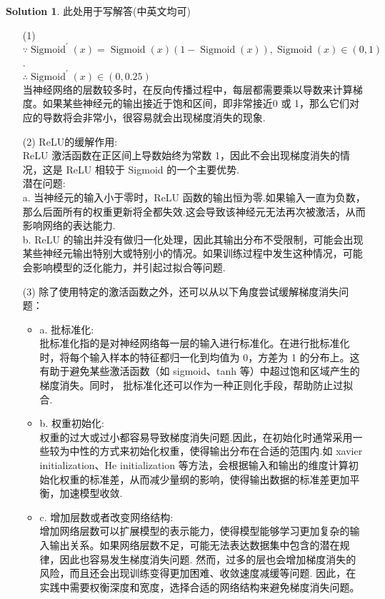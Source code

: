 \documentclass[a4paper,UTF8]{article}
\numberwithin{equation}{section}
\numberwithin{equation}{section}
\theoremstyle{definition}
\newtheorem*{solution}{Solution}
\begin{document}
\begin{solution}
    此处用于写解答(中英文均可)
	\begin{enumerate}
        \item [(1)]
        $\because\operatorname*{Sigmoid}^{\prime}(x) = \operatorname*{Sigmoid}(x)(1-\operatorname*{Sigmoid}(x)), \operatorname*{Sigmoid}(x) \in (0, 1)$.\\
        $\therefore \operatorname*{Sigmoid}^{\prime}(x) \in (0, 0.25)$ \\
        当神经网络的层数较多时，在反向传播过程中，每层都需要乘以导数来计算梯度。如果某些神经元的输出接近于饱和区间，即非常接近0 或 1，那么它们对应的导数将会非常小，很容易就会出现梯度消失的现象.
        \item [(2)]
        ReLU的缓解作用: \\
        ReLU 激活函数在正区间上导数始终为常数 1，因此不会出现梯度消失的情况，这是 ReLU 相较于 Sigmoid 的一个主要优势. \\
        潜在问题: \\
        a. 当神经元的输入小于零时，ReLU 函数的输出恒为零.如果输入一直为负数，那么后面所有的权重更新将全都失效.这会导致该神经元无法再次被激活，从而影响网络的表达能力. \\
        b. ReLU 的输出并没有做归一化处理，因此其输出分布不受限制，可能会出现某些神经元输出特别大或特别小的情况。如果训练过程中发生这种情况，可能会影响模型的泛化能力，并引起过拟合等问题.
        \item [(3)]
        除了使用特定的激活函数之外，还可以从以下角度尝试缓解梯度消失问题：
        \begin{itemize}
            \item a. 批标准化: \\批标准化指的是对神经网络每一层的输入进行标准化。在进行批标准化时，将每个输入样本的特征都归一化到均值为 0，方差为 1 的分布上。这有助于避免某些激活函数（如 sigmoid、tanh 等）中超过饱和区域产生的梯度消失。同时， 批标准化还可以作为一种正则化手段，帮助防止过拟合.
            \item b. 权重初始化: \\
            权重的过大或过小都容易导致梯度消失问题.因此，在初始化时通常采用一些较为中性的方式来初始化权重，使得输出分布在合适的范围内.如 xavier initialization、He initialization 等方法，会根据输入和输出的维度计算初始化权重的标准差，从而减少量纲的影响，使得输出数据的标准差更加平衡，加速模型收敛.
            \item c. 增加层数或者改变网络结构: \\
            增加网络层数可以扩展模型的表示能力，使得模型能够学习更加复杂的输入输出关系。如果网络层数不足，可能无法表达数据集中包含的潜在规律，因此也容易发生梯度消失问题. 然而，过多的层也会增加梯度消失的风险，而且还会出现训练变得更加困难、收敛速度减缓等问题. 因此，在实践中需要权衡深度和宽度，选择合适的网络结构来避免梯度消失问题。
        \end{itemize}
    \end{enumerate}
\end{solution}
\end{document}
